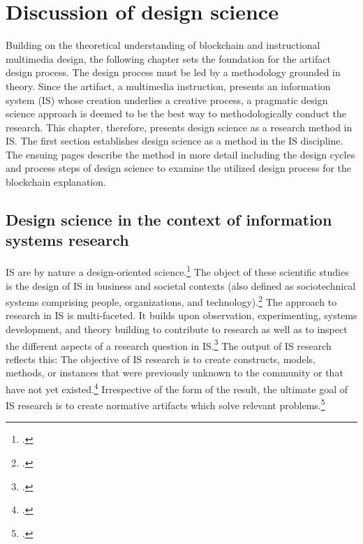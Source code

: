 \chapter{Discussion of design science} \label{chap:DesignScience}

Building on the theoretical understanding of blockchain and instructional multimedia design, the following chapter sets the foundation for the artifact design process. The design process must be led by a methodology grounded in theory. Since the artifact, a multimedia instruction, presents an information system (\acs{IS}) whose creation underlies a creative process, a pragmatic design science approach is deemed to be the best way to methodologically conduct the research. This chapter, therefore, presents design science as a research method in \acs{IS}. The first section establishes design science as a method in the \acs{IS} discipline. The ensuing pages describe the method in more detail including the design cycles and process steps of design science to examine the utilized design process for the blockchain explanation.

\section{Design science in the context of information systems research} \label{DesignScienceInISR}

\acf{IS} are by nature a design-oriented science.\footcites[Cf. in addition][]{OsterleGestaltungsorientierteWirtschaftsinformatikPladoyer2010} The object of these scientific studies is the design of \ac{IS} in business and societal contexts (also defined as sociotechnical systems comprising people, organizations, and technology).\footcites[Cf.][p.671]{OsterleMemorandumzurgestaltungsorientierten2010}[cf.][p.98]{HevnerDesignScienceResearch2004}[cf.][p.11]{OsterleGestaltungsorientierteWirtschaftsinformatikPladoyer2010}[cf.][p.252]{MarchDesignnaturalscience1995}
The approach to research in \ac{IS} is multi-faceted. It builds upon observation, experimenting, systems development, and theory building to contribute to research as well as to inspect the different aspects of a research question in \ac{IS}.\footcite[Cf.][p.86]{NunamakerSystemsdevelopmentInformation1991} The output of \ac{IS} research reflects this: The objective of \ac{IS} research is to create constructs, models, methods, or instances that were previously unknown to the community or that have not yet existed.\footcites[Cf.][p.12]{OsterleGestaltungsorientierteWirtschaftsinformatikPladoyer2010}[cf.][p.130]{ThomasBekannteundweniger2014} 
Irrespective of the form of the result, the ultimate goal of \ac{IS} research is to create normative artifacts which solve relevant problems.\footcite[Cf.][p.130]{ThomasBekannteundweniger2014}

